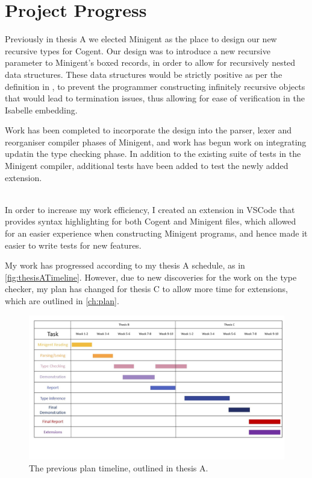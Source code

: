 \chapter{Project Progress}\label{ch:progress}

Previously in thesis A we elected Minigent as the place to design our new recursive types for Cogent.
Our design was to introduce a new recursive parameter to Minigent's boxed records, in order to allow
for recursively nested data structures. These data structures would be strictly positive as per the 
definition in , to prevent the programmer constructing infinitely recursive
objects that would lead to termination issues, thus allowing for ease of verification in
the Isabelle embedding.

Work has been completed to incorporate the design into the parser, lexer and reorganiser compiler phases of
Minigent, and work has begun work on integrating updatin the type checking phase.
In addition to the existing suite of tests in the Minigent compiler, additional tests have 
been added to test the newly added extension.

 \\
In order to increase my work efficiency, I created an extension in VSCode that provides syntax highlighting
for both Cogent and Minigent files, which allowed for an easier experience when constructing Minigent programs,
and hence made it easier to write tests for new features.

My work has progressed according to my thesis A schedule, as in \autoref{fig:thesisATimeline}. However, due to 
new discoveries  for the work on the type checker, my plan has changed for 
thesis C to allow more time for extensions, which are outlined in \autoref{ch:plan}.

\begin{figure}
    \centering
    \includegraphics[width=\linewidth]{content/previous_plan.jpg}
    \caption{The previous plan timeline, outlined in thesis A.}
    \label{fig:thesisATimeline}
\end{figure}

